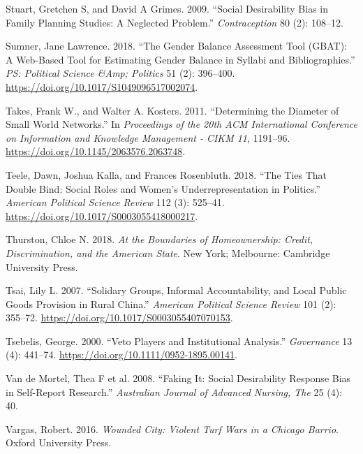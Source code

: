 \documentclass{book}
\newlength{\cslhangindent}
\newlength{\cslentryspacingunit} %
\newenvironment{CSLReferences}[2] %
 {%
  \setlength{\parindent}{0pt}
  \ifodd #1
  \let\oldpar\par
  \def\par{\hangindent=\cslhangindent\oldpar}
  \fi
  \setlength{\parskip}{#2\cslentryspacingunit}
 }%
 {}
\begin{document}
\begin{CSLReferences}{1}{0}
\leavevmode{}%
Stuart, Gretchen S, and David A Grimes. 2009. {``Social Desirability Bias in
Family Planning Studies: A Neglected Problem.''} \emph{Contraception} 80 (2):
108--12.

\leavevmode{}%
Sumner, Jane Lawrence. 2018. {``The Gender Balance Assessment Tool (GBAT): A
Web-Based Tool for Estimating Gender Balance in Syllabi and Bibliographies.''}
\emph{PS: Political Science \&Amp; Politics} 51 (2): 396--400.
\url{https://doi.org/10.1017/S1049096517002074}.

\leavevmode{}%
Takes, Frank W., and Walter A. Kosters. 2011. {``Determining the Diameter of
Small World Networks.''} In \emph{Proceedings of the 20th {ACM} International
Conference on Information and Knowledge Management - {CIKM}
{\textquotesingle}11}, 1191--96.
\url{https://doi.org/10.1145/2063576.2063748}.

\leavevmode{}%
Teele, Dawn, Joshua Kalla, and Frances Rosenbluth. 2018. {``The Ties That
Double Bind: Social Roles and Women's Underrepresentation in Politics.''}
\emph{American Political Science Review} 112 (3): 525--41.
\url{https://doi.org/10.1017/S0003055418000217}.

\leavevmode{}%
Thurston, Chloe N. 2018. \emph{At the Boundaries of Homeownership: Credit,
Discrimination, and the American State}. New York; Melbourne: Cambridge
University Press.

\leavevmode{}%
Tsai, Lily L. 2007. {``Solidary Groups, Informal Accountability, and Local
Public Goods Provision in Rural China.''} \emph{American Political Science
Review} 101 (2): 355--72. \url{https://doi.org/10.1017/S0003055407070153}.

\leavevmode{}%
Tsebelis, George. 2000. {``Veto {Players} and {Institutional Analysis}.''}
\emph{Governance} 13 (4): 441--74.
\url{https://doi.org/10.1111/0952-1895.00141}.

\leavevmode{}%
Van de Mortel, Thea F et al. 2008. {``Faking It: Social Desirability Response
Bias in Self-Report Research.''} \emph{Australian Journal of Advanced Nursing,
The} 25 (4): 40.

\leavevmode{}%
Vargas, Robert. 2016. \emph{Wounded City: Violent Turf Wars in a Chicago
Barrio}. Oxford University Press.


\end{CSLReferences}
\end{document}
